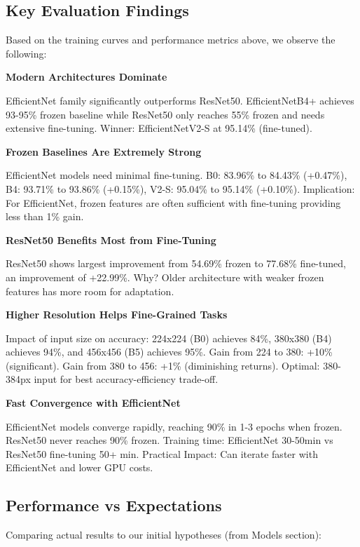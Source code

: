 \documentclass[
  letterpaper,
  DIV=11,
  numbers=noendperiod]{scrartcl}
\begin{document}
\subsection{Key Evaluation Findings}\label{key-evaluation-findings}

Based on the training curves and performance metrics above, we observe
the following:

\textbf{Modern Architectures Dominate}

EfficientNet family significantly outperforms ResNet50. EfficientNetB4+
achieves 93-95\% frozen baseline while ResNet50 only reaches 55\% frozen
and needs extensive fine-tuning. Winner: EfficientNetV2-S at 95.14\%
(fine-tuned).

\textbf{Frozen Baselines Are Extremely Strong}

EfficientNet models need minimal fine-tuning. B0: 83.96\% to 84.43\%
(+0.47\%), B4: 93.71\% to 93.86\% (+0.15\%), V2-S: 95.04\% to 95.14\%
(+0.10\%). Implication: For EfficientNet, frozen features are often
sufficient with fine-tuning providing less than 1\% gain.

\textbf{ResNet50 Benefits Most from Fine-Tuning}

ResNet50 shows largest improvement from 54.69\% frozen to 77.68\%
fine-tuned, an improvement of +22.99\%. Why? Older architecture with
weaker frozen features has more room for adaptation.

\textbf{Higher Resolution Helps Fine-Grained Tasks}

Impact of input size on accuracy: 224x224 (B0) achieves 84\%, 380x380
(B4) achieves 94\%, and 456x456 (B5) achieves 95\%. Gain from 224 to
380: +10\% (significant). Gain from 380 to 456: +1\% (diminishing
returns). Optimal: 380-384px input for best accuracy-efficiency
trade-off.

\textbf{Fast Convergence with EfficientNet}

EfficientNet models converge rapidly, reaching 90\% in 1-3 epochs when
frozen. ResNet50 never reaches 90\% frozen. Training time: EfficientNet
30-50min vs ResNet50 fine-tuning 50+ min. Practical Impact: Can iterate
faster with EfficientNet and lower GPU costs.

\subsection{Performance vs
Expectations}\label{performance-vs-expectations}

Comparing actual results to our initial hypotheses (from Models
section):
\end{document}
